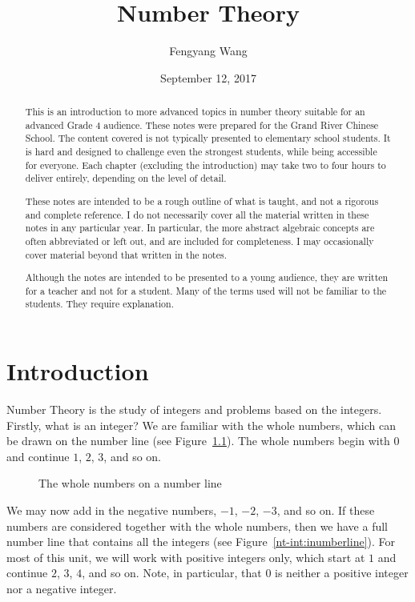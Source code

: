 \documentclass[a4paper,10pt]{report}
\title{Number Theory}
\author{Fengyang Wang}
\date{September 12, 2017}
\begin{document}
\begin{abstract}

This is an introduction to more advanced topics in number theory suitable for
an advanced Grade 4 audience. These notes were prepared for the Grand River
Chinese School. The content covered is not typically presented to elementary
school students. It is hard and designed to challenge even the strongest
students, while being accessible for everyone. Each chapter (excluding the
introduction) may take two to four hours to deliver entirely, depending on the
level of detail.

These notes are intended to be a rough outline of what is taught, and not a
rigorous and complete reference. I do not necessarily cover all the material
written in these notes in any particular year. In particular, the more abstract
algebraic concepts are often abbreviated or left out, and are included for
completeness. I may occasionally cover material beyond that written in the
notes.

Although the notes are intended to be presented to a young audience, they are
written for a teacher and not for a student. Many of the terms used will not be
familiar to the students. They require explanation.

\end{abstract}

\maketitle

\tableofcontents

\chapter{Introduction}

Number Theory is the study of \glspl{integer} and problems based on the
integers. Firstly, what is an integer? We are familiar with the whole numbers,
which can be drawn on the number line (see Figure~\ref{nt-int:pnumberline}).
The whole numbers begin with \(0\) and continue \(1\), \(2\), \(3\), and so on.

\begin{figure}

 \caption{The whole numbers on a number line}
 \label{nt-int:pnumberline}
\end{figure}

We may now add in the negative numbers, \(-1\), \(-2\), \(-3\), and so on. If
these numbers are considered together with the whole numbers, then we have a
full number line that contains all the integers (see
Figure~\ref{nt-int:inumberline}). For most of this unit, we will work with
positive integers only, which start at \(1\) and continue \(2\), \(3\), \(4\),
and so on. Note, in particular, that \(0\) is neither a positive integer nor a
negative integer.
\end{document}
